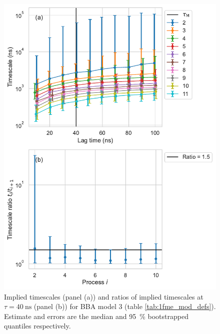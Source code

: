 \documentclass{article}
\begin{document}
\begin{figure}
    \centering
    \includegraphics[height=0.65\textheight]{figures/its/bba/BBA_model_dist._method_m1.pdf}
    \caption{Implied timescales (panel (a)) and ratios of implied timescales at $\tau=\SI{40}{\nano\second}$ (panel (b)) for BBA model 3 (table \ref{tab:1fme_mod_defs}). Estimate and errors are the median and \SI{95}{\percent} bootstrapped quantiles respectively.}
    \label{fig:its_bba_3}
\end{figure}
\end{document}
